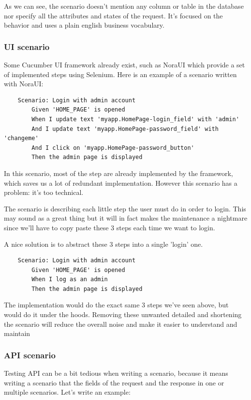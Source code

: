 As we can see, the scenario doesn't mention any column or table in the
database nor specify all the attributes and states of the request.
It's focused on the behavior and uses a plain english business vocabulary.

\subsubsection{UI scenario}
Some Cucumber UI framework already exist, such as NoraUI which provide a set
of implemented steps using Selenium.
Here is an example of a scenario written with NoraUI:

\begin{verbatim}
    Scenario: Login with admin account
        Given 'HOME_PAGE' is opened
        When I update text 'myapp.HomePage-login_field' with 'admin'
        And I update text 'myapp.HomePage-password_field' with 'changeme'
        And I click on 'myapp.HomePage-password_button'
        Then the admin page is displayed
\end{verbatim}

In this scenario, most of the step are already implemented by the framework,
which saves us a lot of redundant implementation.
However this scenario has a problem: it's too technical.

The scenario is describing each little step the user must do in order to login.
This may sound as a great thing but it will in fact makes the maintenance a
nightmare since we'll have to copy paste these 3 steps each time we want to
login.

A nice solution is to abstract these 3 steps into a single 'login' one.

\begin{verbatim}
    Scenario: Login with admin account
        Given 'HOME_PAGE' is opened
        When I log as an admin
        Then the admin page is displayed
\end{verbatim}

The implementation would do the exact same 3 steps we've seen above, but
would do it under the hoods.
Removing these unwanted detailed and shortening the scenario will reduce the
overall noise and make it easier to understand and maintain

\subsubsection{API scenario}
Testing API can be a bit tedious when writing a scenario, because it means
writing a scenario that the fields of the request and the response in one or
multiple scenarios.
Let's write an example:

